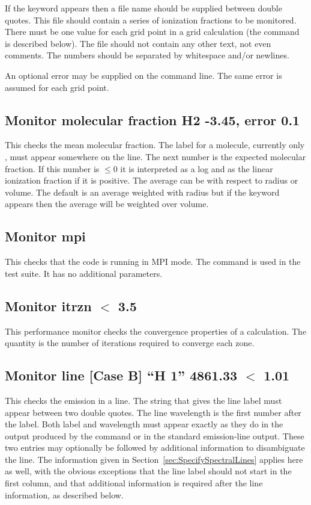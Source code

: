 If the keyword  appears then a file name should be supplied
between double quotes. This file should contain a series of ionization
fractions to be monitored. There must be one value for each grid point in a
grid calculation (the  command is described below). The file
should not contain any other text, not even comments. The numbers should be
separated by whitespace and/or newlines.

An optional error may be supplied on the command line. The same error is
assumed for each grid point.

\subsection{Monitor molecular fraction H2 -3.45, error 0.1}

This checks the mean molecular fraction.
The label for a molecule,
currently only \htwo, must appear somewhere on the line.
The next number is
the expected molecular fraction.
If this number is $\le 0$ it is interpreted
as a log and as the linear ionization fraction if it is positive.
The
average can be with respect to radius or volume.
The default is an average
weighted with radius but if the keyword  appears then the average
will be weighted over volume.

\subsection{Monitor mpi}

This checks that the code is running in MPI mode. The command is used
in the  test suite. It has no additional parameters.

\subsection{Monitor itrzn $<$ 3.5}

This performance monitor checks the convergence properties of a calculation.
The quantity
is the number of iterations required to converge each zone.

\subsection{Monitor line [Case B] ``H  1'' 4861.33 $<$ 1.01}

This checks the emission in a line.
The string that gives the line label must appear between
two double quotes.
The line wavelength is the first number after the label.
Both label and wavelength must appear exactly as they do in the output
produced by the  command or
in the standard emission-line output. These two entries may optionally
be followed by additional information to disambiguate the line.
The information given in Section~\ref{sec:SpecifySpectralLines} applies
here as well, with the obvious exceptions that the line label should
not start in the first column, and that additional information is
required after the line information, as described below.

